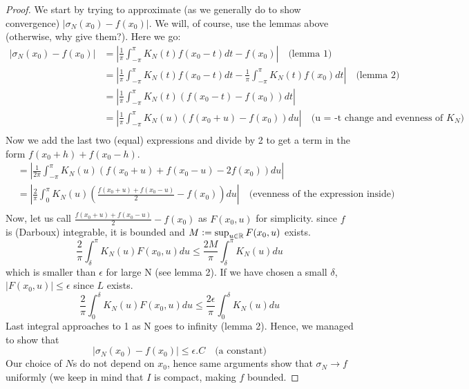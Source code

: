 \documentclass{article}
\theoremstyle{remark}
\theoremstyle{lemma}
\theoremstyle{example}
\theoremstyle{proofTrial}
\theoremstyle{definition}
\begin{document}
\begin{proof}
We start by trying to approximate (as we generally do to show convergence) $|\sigma_N(x_0) - f(x_0)|$. We will, of course, use the lemmas above (otherwise, why give them?). Here we go:
\begin{align*}
|\sigma_N(x_0) - f(x_0)| &= \left|\frac{1}{\pi} \int_{-\pi}^{\pi} K_N(t)f(x_0-t)dt - f(x_0)\right| \quad\text{(lemma 1)} \\
&= \left|\frac{1}{\pi} \int_{-\pi}^{\pi} K_N(t)f(x_0-t)dt - \frac{1}{\pi} \int_{-\pi}^{\pi} K_N(t)f(x_0)dt\right| \quad\text{(lemma 2)} \\
&= \left|\frac{1}{\pi} \int_{-\pi}^{\pi} K_N(t)(f(x_0-t) - f(x_0))dt \right|\\
&= \left|\frac{1}{\pi} \int_{-\pi}^{\pi} K_N(u)(f(x_0+u) - f(x_0))du \right| \quad\text{(u = -t change and evenness of $K_N$)}\\
\end{align*}
Now we add the last two (equal) expressions and divide by 2 to get a term in the form $f(x_0 + h) + f(x_0 - h)$.
\begin{align*}
    &= \left|\frac{1}{2\pi} \int_{-\pi}^{\pi} K_N(u)(f(x_0+u) + f(x_0 - u) - 2f(x_0))du \right| \\
    &= \left|\frac{2}{\pi} \int_{0}^{\pi} K_N(u)(\frac{f(x_0+u) + f(x_0 - u)}{2} - f(x_0))du \right| \quad\text{(evenness of the expression inside)}\\
\end{align*}
Now, let us call $\frac{f(x_0+u) + f(x_0 - u)}{2} - f(x_0)$ as $F(x_0,u)$ for simplicity. since \(f\) is (Darboux) integrable, it is bounded and $M \vcentcolon = \sup_{u \in \mathbb{R}} F(x_0,u)$ exists.
\[
\frac{2}{\pi} \int_{\delta}^{\pi} K_N(u)F(x_0,u)du \leq \frac{2M}{\pi} \int_{\delta}^{\pi} K_N(u)du
\]
which is smaller than $\epsilon$ for large N (see lemma 2). If we have chosen a small $\delta$, $|F(x_0, u)| \leq \epsilon$ since $L$ exists.
\[
\frac{2}{\pi} \int_{0}^{\delta} K_N(u)F(x_0,u)du \leq \frac{2\epsilon}{\pi} \int_{0}^{\delta} K_N(u)du
\]
Last integral approaches to 1 as N goes to infinity (lemma 2). Hence, we managed to show that
\[
|\sigma_N(x_0) - f(x_0)| \leq \epsilon . C \quad\text{(a constant)}
\]
Our choice of $N$s do not depend on $x_0$, hence same arguments show that $\sigma_N \to f$ uniformly (we keep in mind that $I$ is compact, making \(f\) bounded.
\end{proof}
\end{document}
